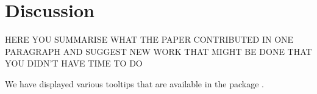 \section{Discussion}\label{discussion}

HERE YOU SUMMARISE WHAT THE PAPER CONTRIBUTED IN ONE PARAGRAPH AND SUGGEST NEW WORK THAT MIGHT BE DONE THAT YOU DIDN'T HAVE TIME TO DO

We have displayed various tooltips that are available in the package .



\address{%
Cuong Nguyen\\
Monash University\\%
Department of Econometrics and Business Statistics\\ Melbourne, Australia\\
%
\url{https://alex-nguyen-vn.github.io}\\%
\textit{ORCiD: \href{https://orcid.org/0000-0000-0000-0000}{0000-0000-0000-0000}}\\%
\href{mailto:qquo@ulm.edu}{\nolinkurl{qquo@ulm.edu}}%
}

\address{%
Michael Lydeamore\\
Monash University\\%
Department of Econometrics and Business Statistics\\ Melbourne, Australia\\
%
\url{https://www.michaellydeamore.com}\\%
\textit{ORCiD: \href{https://orcid.org/0000-0001-6515-827X}{0000-0001-6515-827X}}\\%
\href{mailto:michael.lydeamore@monash.edu}{\nolinkurl{michael.lydeamore@monash.edu}}%
}

\address{%
Dianne Cook\\
Monash University\\%
Department of Econometrics and Business Statistics\\ Melbourne, Australia\\
%
\url{https://www.dicook.org}\\%
\textit{ORCiD: \href{https://orcid.org/0000-0002-3813-7155}{0000-0002-3813-7155}}\\%
\href{mailto:dicook@monash.edu}{\nolinkurl{dicook@monash.edu}}%
}
